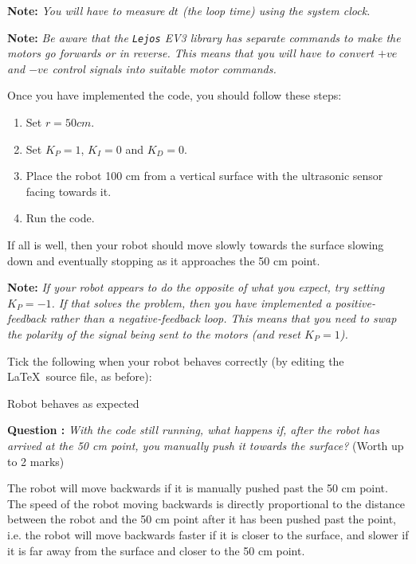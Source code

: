 \documentclass[hidelinks,a4paper,11pt]{article}
\newcommand{\cmark}{\ding{51}}%
\newcommand{\done}{\rlap{$\square$}{\raisebox{2pt}{\large\hspace{1pt}\cmark}}
\hspace{-2.5pt}}
\newcounter{question}
\newcommand\myq{\refstepcounter{question}\thequestion}
\begin{document}
{\bfseries Note:}  \emph{You will have to measure $dt$ (the loop time) using the system clock.}

{\bfseries Note:}  \emph{Be aware that the \texttt{Lejos} EV3 library has separate commands to make
the motors go forwards or in reverse.  This means that you will have to convert $+ve$ and $-ve$
control signals into suitable motor commands.}

Once you have implemented the code, you should follow these steps:
\begin{enumerate}
	\item Set $r=50 cm$.
	\item Set $K_P=1$, $K_I=0$ and $K_D=0$.
	\item Place the robot 100 cm from a vertical surface with the ultrasonic sensor facing towards it.
	\item Run the code.
\end{enumerate}

If all is well, then your robot should move slowly towards the surface slowing down and eventually
stopping as it approaches the 50 cm point.

{\bfseries Note:}  \emph{If your robot appears to do the opposite of what you expect, try setting
$K_P=-1$.  If that solves the problem, then you have implemented a positive-feedback rather than a
negative-feedback loop.  This means that you need to swap the polarity of the signal being sent to
the motors (and reset $K_P=1$).}

Tick the following when your robot behaves correctly (by editing the \LaTeX\ source file, as
before):
\begin{todolist}
	\item[\done]  Robot behaves as expected
\end{todolist}

{\bfseries Question \myq:}  \emph{With the code still running, what happens if, after the robot has
arrived at the 50 cm point, you manually push it towards the surface?} (Worth up to 2 marks)\\
\begin{mdframed}
The robot will move backwards if it is manually pushed past the 50 cm point. The speed of the robot
moving backwards is directly proportional to the distance between the robot and the 50 cm point
after it has been pushed past the point, i.e. the robot will move backwards faster if it is closer
to the surface, and slower if it is far away from the surface and closer to the 50 cm point.
\end{mdframed}
\vspace*{\baselineskip}
\end{document}

